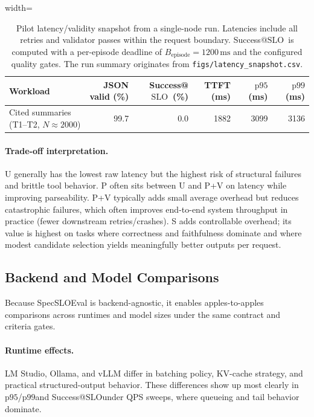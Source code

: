 \documentclass[11pt]{article}
\newcommand{\pninetyfive}{\ensuremath{\mathrm{p95}}}
\newcommand{\pninetynine}{\ensuremath{\mathrm{p99}}}
\newcommand{\slo}{\ensuremath{\mathrm{SLO}}}
\begin{document}
\begin{table}[t]
\centering
\small
\begin{adjustbox}{width=\linewidth}
\begin{tabular}{@{}lrrrrr@{}}
\toprule
\textbf{Workload} & \textbf{JSON valid (\%)} & \textbf{Success@\slo\ (\%)} & \textbf{TTFT (ms)} & \textbf{\pninetyfive\ (ms)} & \textbf{\pninetynine\ (ms)} \\
\midrule
Cited summaries (T1--T2, $N\approx 2000$) & 99.7 & 0.0 & 1882 & 3099 & 3136 \\
\bottomrule
\end{tabular}
\end{adjustbox}
\caption{Pilot latency/validity snapshot from a single-node run.
Latencies include all retries and validator passes within the request boundary.
Success@\slo\ is computed with a per-episode deadline of $B_{\text{episode}}=1200\,\mathrm{ms}$ and the configured quality gates.
The run summary originates from \texttt{figs/latency\_snapshot.csv}.}
\label{tab:latency-snapshots}
\end{table}

\paragraph{Trade-off interpretation.}
U generally has the lowest raw latency but the highest risk of structural failures and brittle tool behavior.
P often sits between U and P+V on latency while improving parseability.
P+V typically adds small average overhead but reduces catastrophic failures, which often improves end-to-end system throughput in practice (fewer downstream retries/crashes).
S adds controllable overhead; its value is highest on tasks where correctness and faithfulness dominate and where modest candidate selection yields meaningfully better outputs per request.

\subsection{Backend and Model Comparisons}
\label{sec:results-backends}

Because SpecSLOEval is backend-agnostic, it enables apples-to-apples comparisons across runtimes and model sizes under the same contract and criteria gates.

\paragraph{Runtime effects.}
LM Studio, Ollama, and vLLM differ in batching policy, KV-cache strategy, and practical structured-output behavior.
These differences show up most clearly in \pninetyfive/\pninetynine and Success@\slo under QPS sweeps, where queueing and tail behavior dominate.
\end{document}
